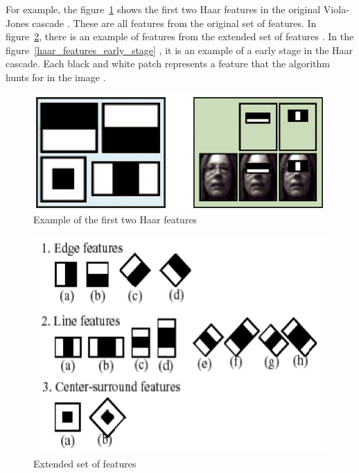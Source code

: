 \noindent For example, the figure~\ref{haar_features_first_2_stage} shows the first two Haar features in the original Viola-Jones cascade \cite{HEW07}. These are all features from the original set of features. In figure~\ref{haar_features_extended}, there is an example of features from the extended set of features \cite{DIN08}. In the figure~\ref{haar_features_early_stage} , it is an example of a early stage in the Haar cascade. Each black and white patch represents a feature that the algorithm hunts for in the image \cite{HAR12}.
\newline

\begin{figure}[!h]
\begin{center}
\noindent \includegraphics[scale=0.9]{figures/haar_features_first_2_stage} 
\newline
\caption{Example of the first two Haar features}
\label{haar_features_first_2_stage}
\end{center} 
\end{figure}

\begin{figure}[!h]
\begin{center}
\noindent \includegraphics[scale=0.6]{figures/haar_features_extended} 
\newline
\caption{Extended set of features}
\label{haar_features_extended}
\end{center} 
\end{figure}

